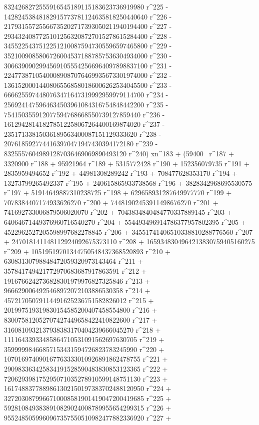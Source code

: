        8324268272555916545189115183623736919980 r^225 - 
       14282453848182915773781124635818250440640 r^226 - 
       21793155725566735202717393050211940194400 r^227 - 
       29343240877251012563208727015278615284400 r^228 - 
       34552254375122512100875947305596597465800 r^229 - 
       35210090858067260045371887857536304934000 r^230 - 
       30663909029945691055542566964097898837100 r^231 - 
       22477387105400089087076469935673301974000 r^232 - 
       13615200014408065568580186006262534045500 r^233 - 
       6666255974480763471647319992959979114700 r^234 - 
       2569241475964634503961084316754848442200 r^235 - 
       754150355912077594768668550739127859440 r^236 - 
       161294281418278512258067264400169874020 r^237 - 
       23517133815036189563400087151129333620 r^238 - 
       2076185927744163970471947430394172180 r^239 - 
       83255576049891287036469069890493120 r^240) xn^183 + (59400 \
r^187 + 3320900 r^188 + 95921964 r^189 + 5315772428 r^190 + 
       152356079735 r^191 + 2835959494652 r^192 + 
       44981308289242 r^193 + 708477628353170 r^194 + 
       13273799265492337 r^195 + 240615865933738568 r^196 + 
       3828342968695530575 r^197 + 51914649887310238725 r^198 + 
       629658931287649977770 r^199 + 7078384407174933626270 r^200 + 
       74481902453911498676270 r^201 + 
       741692733006879506020070 r^202 + 
       7043834840484770337889145 r^203 + 
       64064671449376960716540270 r^204 + 
       554493496914786377957802395 r^205 + 
       4522962527205598997682278845 r^206 + 
       34551741406510338810288776560 r^207 + 
       247018141148112924092675373110 r^208 + 
       1659348304964213830759405160275 r^209 + 
       10519519701344750548437368520893 r^210 + 
       63083130798848472059320973143464 r^211 + 
       357841749421772970683687917863591 r^212 + 
       1916766242736828301979976827325846 r^213 + 
       9666290064925468972072103886530358 r^214 + 
       45721705079114491625236751582826012 r^215 + 
       201997519319830154585200407458554800 r^216 + 
       830075812052707427449658422410822600 r^217 + 
       3160810932137938383170404239666045270 r^218 + 
       11116433933485864710531091562697630705 r^219 + 
       35999998466857153431594726823783245990 r^220 + 
       107016974090167763333010926891862478755 r^221 + 
       290983363425834191528590483830853123365 r^222 + 
       720629398175295071035278910599148751130 r^223 + 
       1617488377889861302150197383702488120950 r^224 + 
       3272030879966710008581901419047200419685 r^225 + 
       5928108493838910829024008789955654299315 r^226 + 
       9552485059960967357550510982477882336920 r^227 + 
